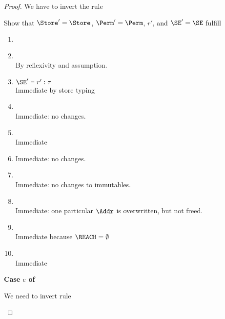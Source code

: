 \begin{proof}
  We have to invert the rule 
  \begin{mathpar}
  \end{mathpar}
  Show that $\Store' = \Store$, $\Perm' = \Perm$, $r'$, and $\SE' =
  \SE$ fulfill
  \begin{enumerate}[({R}1)]
  \item {}
  \item {} \\
    By reflexivity and assumption.
  \item $\SE' \vdash r' : \tau$ \\
    Immediate by store typing
  \item {} \\
    Immediate: no changes.
  \item {} \\
    Immediate
  \item {}
    Immediate: no changes.
  \item {} \\
    Immediate: no changes to immutables.
  \item {}  \\
    Immediate: one particular $\Addr$ is overwritten, but not freed.
  \item {} \\
    Immediate because $\REACH = \emptyset$
  \item {} \\
    Immediate
  \end{enumerate}

  \newpage
  \textbf{Case $e$ of}

  We need to invert rule 
  \begin{mathpar}
  \end{mathpar}


\end{proof}
